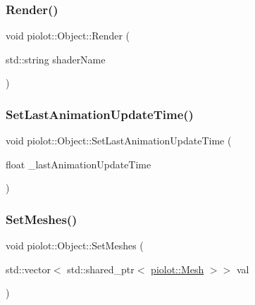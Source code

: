 \subsubsection{\texorpdfstring{Render()}{Render()}}
{\footnotesize\ttfamily void piolot\+::\+Object\+::\+Render (\begin{DoxyParamCaption}\item[{std\+::string}]{shader\+Name }\end{DoxyParamCaption})}

\mbox{\label{classpiolot_1_1_object_a39a9f4b026f1e1d97cde05b131fd56d8}} 
\subsubsection{\texorpdfstring{Set\+Last\+Animation\+Update\+Time()}{SetLastAnimationUpdateTime()}}
{\footnotesize\ttfamily void piolot\+::\+Object\+::\+Set\+Last\+Animation\+Update\+Time (\begin{DoxyParamCaption}\item[{float}]{\+\_\+last\+Animation\+Update\+Time }\end{DoxyParamCaption})\hspace{0.3cm}{\ttfamily [inline]}}

\mbox{\label{classpiolot_1_1_object_abe2585d95f1cb2b388ea3bdf7868b968}} 
\subsubsection{\texorpdfstring{Set\+Meshes()}{SetMeshes()}}
{\footnotesize\ttfamily void piolot\+::\+Object\+::\+Set\+Meshes (\begin{DoxyParamCaption}\item[{std\+::vector$<$ std\+::shared\+\_\+ptr$<$ \mbox{\hyperlink{classpiolot_1_1_mesh}{piolot\+::\+Mesh}} $>$$>$}]{val }\end{DoxyParamCaption})\hspace{0.3cm}{\ttfamily [inline]}}



